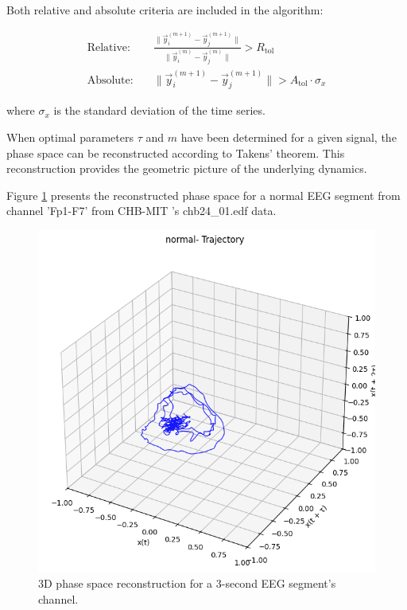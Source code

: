 \documentclass{article}
\begin{document}
			Both relative and absolute criteria are included in the algorithm:

			\begin{align}
			\text{Relative:} &\quad \frac{\|\vec{y}_i^{(m+1)} - \vec{y}_j^{(m+1)}\|}{\|\vec{y}_i^{(m)} - \vec{y}_j^{(m)}\|} > R_{\text{tol}} \\
			\text{Absolute:} &\quad \|\vec{y}_i^{(m+1)} - \vec{y}_j^{(m+1)}\| > A_{\text{tol}} \cdot \sigma_x
			\end{align}

			where $\sigma_x$ is the standard deviation of the time series.
			



			When optimal parameters $\tau$ and $m$ have been determined for a given signal, 
			the phase space can be reconstructed according to Takens' theorem. This reconstruction provides the
			geometric picture of the underlying dynamics.

			Figure \ref{fig:phase_space_3d} presents the reconstructed phase space for a normal EEG segment from channel 'Fp1-F7' from CHB-MIT 's chb24\_01.edf data.

				\begin{figure}[h!]
				    \centering
				    \includegraphics[width=0.7\linewidth]{phase_space_3d.png} %
				    \caption{3D phase space reconstruction for a 3-second EEG segment's channel.}
				    \label{fig:phase_space_3d}
				\end{figure}



\end{document}
